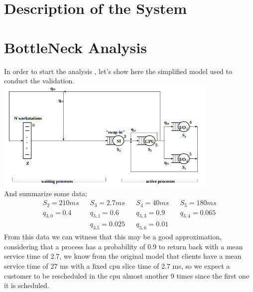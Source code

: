\documentclass[12pt,a4paper]{article}
\begin{document}
	
	
	\section{Description of the System}
	

    \section{BottleNeck Analysis}
    In order to start the analysis , let's show here the simplified model 
    used to conduct the validation.
    \includegraphics[width=0.8\textwidth]{Images/simplified_model.png}
    \\And summarize some data:
    \begin{displaymath}
        \begin{aligned}
        S_2 = 210ms && S_3= 2.7ms && S_4 = 40ms && S_5=180ms\\
        q_{3,0}= 0.4&& q_{3,1}=0.6 && q_{3,3} = 0.9 && q_{3,4}= 0.065\\
        && q_{3.5}= 0.025 && q_{3,6}=0.01 && 
        \end{aligned}
    \end{displaymath}
    From this data we can witness that this may be a good approximation, considering that
    a process has a probability of 0.9 to return back with a mean service time of 2.7, 
    we know from the original model that clients have a mean service time of 27 ms with 
    a fixed cpu slice time of 2.7 ms, so we expect a customer to be rescheduled in the cpu 
    almost another 9 times since the first one it is scheduled. \\
\end{document}
